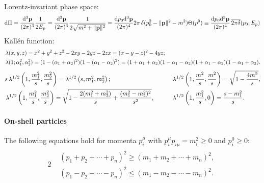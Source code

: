 \documentclass[CheatSheet]{subfiles}
\begin{document}
Lorentz-invariant phase space:
\begin{align}
  \dd\Pi
   = \ddP{p}\frac{1}{2E_{p}}
   = \ddP{p}\frac{1}{2\sqrt{m^2+\|\vc p\|^2}}
   = \frac{\dd p_0\dd^3\vc p}{(2\pi)^4}2\pi\diracdelta(p_0^2-\|\vc p\|^2-m^2)\Theta(p^0)
   \equiv \frac{\dd p_0\dd^3\vc p}{(2\pi)^4}\diracdeltabar(p_0;E_p)
\end{align}
K\"all\'en function:
\begin{align*}
&\Kallen(x,y,z)
= x^2+y^2+z^2-2xy-2yz-2zx
= (x-y-z)^2-4yz;
\\
&
\Kallen(1;\alpha_1^2,\alpha_2^2)
= (1-(\alpha_1+\alpha_2)^2)(1-(\alpha_1-\alpha_2)^2)
= (1+\alpha_1+\alpha_2)(1-\alpha_1-\alpha_2)(1+\alpha_1-\alpha_2)(1-\alpha_1+\alpha_2).
\end{align*}
\begin{alignat*}{2}
&s\Kallen[1/2]\left(1,\frac{m_1^2}{s}, \frac{m_2^2}{s}\right) = \Kallen[1/2]\left(s,m_1^2, m_2^2\right);&
\qquad
&\Kallen[1/2]\left(1,\frac{m^2}{s},\frac{m^2}{s}\right)
= \sqrt{1-\frac{4 m^2}{s}},\\
&\Kallen[1/2]\left(1,\frac{m_1^2}{s},\frac{m_2^2}{s}\right)
= \sqrt{1-\frac{2 (m_1^2+m_2^2)}{s}+\frac{(m_1^2-m_2^2)^2}{s^2}},&
&\Kallen[1/2]\left(1,\frac{m_1^2}{s},0\right)
= \frac{s-m_1^2}{s}.
\end{alignat*}

\paragraph{On-shell particles}
The following equations hold for momenta $p_i^\mu$ with $p_i^\mu p_{i\mu}=m_i^2\ge 0$ and $p_i^0\ge 0$:
\begin{alignat}{2}\begin{split}
&(p_1+p_2+\cdots+p_n)^2\ge(m_1+m_2+\cdots+m_n)^2,\\
&(p_1-p_2-\cdots-p_n)^2\le(m_1-m_2-\cdots-m_n)^2.
\end{split}\label{eq:onshell-limit}
\end{alignat}
\end{document}
